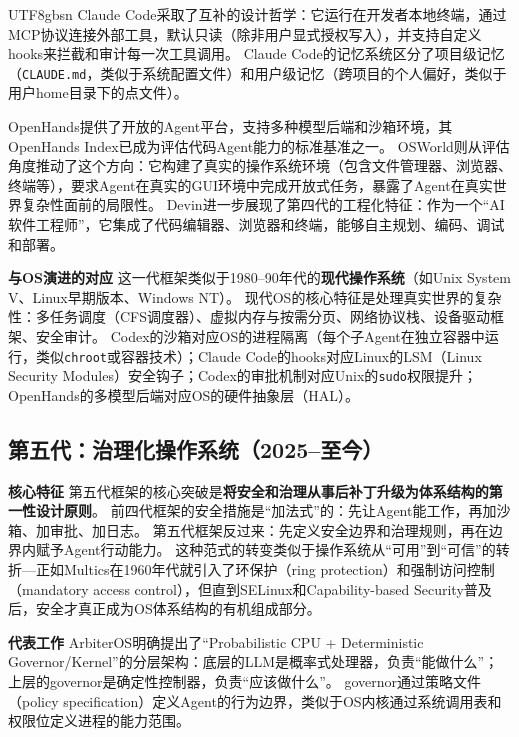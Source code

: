 \documentclass[11pt,a4paper]{article}
\begin{document}
\begin{CJK*}{UTF8}{gbsn}
Claude Code\cite{anthropic_claudecode_overview_2026}采取了互补的设计哲学：它运行在开发者本地终端，通过MCP协议\cite{mcp_intro_2026}连接外部工具，默认只读（除非用户显式授权写入），并支持自定义hooks来拦截和审计每一次工具调用\cite{anthropic_claudecode_security_2026}。
Claude Code的记忆系统\cite{anthropic_claudecode_memory_2026}区分了项目级记忆（\texttt{CLAUDE.md}，类似于系统配置文件）和用户级记忆（跨项目的个人偏好，类似于用户home目录下的点文件）。

OpenHands\cite{openhands_paper_2025}提供了开放的Agent平台，支持多种模型后端和沙箱环境，其OpenHands Index已成为评估代码Agent能力的标准基准之一。
OSWorld\cite{osworld2024}则从评估角度推动了这个方向：它构建了真实的操作系统环境（包含文件管理器、浏览器、终端等），要求Agent在真实的GUI环境中完成开放式任务，暴露了Agent在真实世界复杂性面前的局限性。
Devin\cite{devin2024cognition}进一步展现了第四代的工程化特征：作为一个``AI软件工程师''，它集成了代码编辑器、浏览器和终端，能够自主规划、编码、调试和部署。

\textbf{与OS演进的对应}
这一代框架类似于1980--90年代的\textbf{现代操作系统}（如Unix System V、Linux早期版本、Windows NT）。
现代OS的核心特征是处理真实世界的复杂性：多任务调度（CFS调度器\cite{linux_cfs_2026}）、虚拟内存与按需分页、网络协议栈、设备驱动框架、安全审计。
Codex的沙箱对应OS的进程隔离（每个子Agent在独立容器中运行，类似\texttt{chroot}或容器技术）；Claude Code的hooks对应Linux的LSM（Linux Security Modules）安全钩子；Codex的审批机制对应Unix的\texttt{sudo}权限提升；OpenHands的多模型后端对应OS的硬件抽象层（HAL）。

\subsection*{第五代：治理化操作系统（2025--至今）}

\textbf{核心特征}
第五代框架的核心突破是\textbf{将安全和治理从事后补丁升级为体系结构的第一性设计原则}。
前四代框架的安全措施是``加法式''的：先让Agent能工作，再加沙箱、加审批、加日志。
第五代框架反过来：先定义安全边界和治理规则，再在边界内赋予Agent行动能力。
这种范式的转变类似于操作系统从``可用''到``可信''的转折---正如Multics在1960年代就引入了环保护（ring protection）和强制访问控制（mandatory access control），但直到SELinux和Capability-based Security普及后，安全才真正成为OS体系结构的有机组成部分\cite{ostep_2023}。

\textbf{代表工作}
ArbiterOS\cite{arbiteros2025}明确提出了``Probabilistic CPU + Deterministic Governor/Kernel''的分层架构：底层的LLM是概率式处理器，负责``能做什么''；上层的governor是确定性控制器，负责``应该做什么''。
governor通过策略文件（policy specification）定义Agent的行为边界，类似于OS内核通过系统调用表和权限位定义进程的能力范围。


\end{CJK*}
\end{document}
